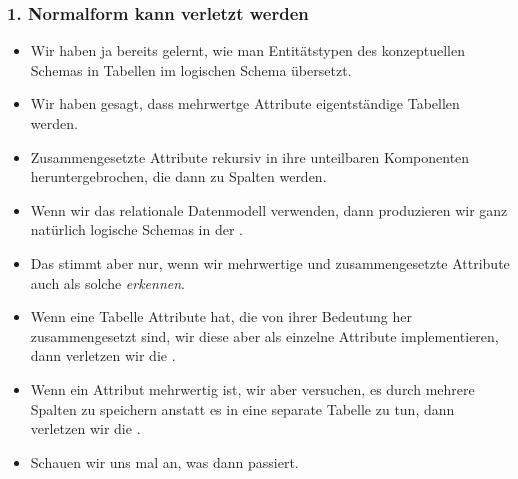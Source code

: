 \documentclass[aspectratio=169,mathserif,notheorems]{beamer}%
\begin{document}
\begin{frame}%
\frametitle{1. Normalform kann verletzt werden}%
\begin{itemize}%
%
\item Wir haben ja bereits gelernt, wie man Entitätstypen des konzeptuellen Schemas in Tabellen im logischen Schema übersetzt.%
%
\item<2-> Wir haben gesagt, dass mehrwertge Attribute eigentständige Tabellen werden.%
%
\item<3-> Zusammengesetzte Attribute rekursiv in ihre unteilbaren Komponenten heruntergebrochen, die dann zu Spalten werden.%
%
\item<4-> Wenn wir das relationale Datenmodell verwenden, dann produzieren wir ganz natürlich logische Schemas in der .%
%
\item<5-> Das stimmt aber nur, wenn wir mehrwertige und zusammengesetzte Attribute auch als solche \emph{erkennen}.%
%
\item<6-> Wenn eine Tabelle Attribute hat, die von ihrer Bedeutung her zusammengesetzt sind, wir diese aber als einzelne Attribute implementieren, dann verletzen wir die .%
%
\item<7-> Wenn ein Attribut mehrwertig ist, wir aber versuchen, es durch mehrere Spalten zu speichern anstatt es in eine separate Tabelle zu tun, dann verletzen wir die .%
%
\item<8-> Schauen wir uns mal an, was dann passiert.%
\end{itemize}%
\end{frame}%
%
\end{document}
